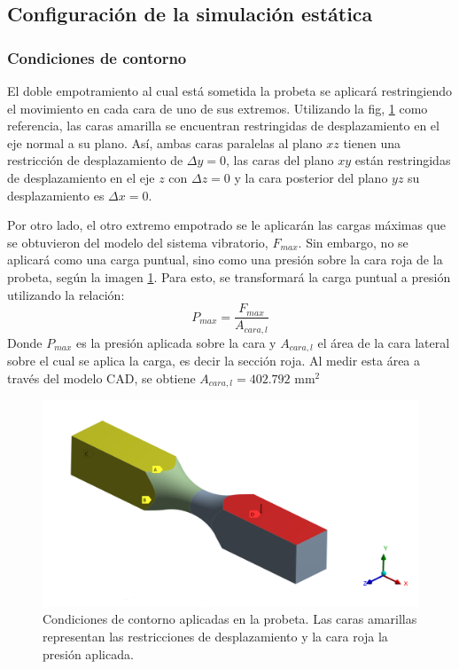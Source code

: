 \newpage

\subsection{Configuración de la simulación estática}
\subsubsection{Condiciones de contorno}
El doble empotramiento al cual está sometida la probeta se aplicará restringiendo el movimiento en cada cara de uno de sus extremos. Utilizando la fig, \ref{fig:cond_borde} como referencia, las caras amarilla se encuentran restringidas de desplazamiento en el eje normal a su plano. Así, ambas caras paralelas al plano $xz$ tienen una restricción de desplazamiento de $\Delta y = 0$, las caras del plano $xy$ están restringidas de desplazamiento en el eje $z$ con $\Delta z = 0$ y la cara posterior del plano $yz$ su desplazamiento es $\Delta x = 0$.

Por otro lado, el otro extremo empotrado se le aplicarán las cargas máximas que se obtuvieron del modelo del sistema vibratorio, $F_{max}$. Sin embargo, no se aplicará como una carga puntual, sino como una presión sobre la cara roja de la probeta, según la imagen \ref{fig:cond_borde}. Para esto, se transformará la carga puntual a presión utilizando la relación:
\begin{equation}\label{eq:p_max}
	P_{max} = \frac{F_{max}}{A_{cara,l}}
\end{equation}
Donde $P_{max}$ es la presión aplicada sobre la cara y $A_{cara,l}$ el área de la cara lateral sobre el cual se aplica la carga, es decir la sección roja. Al medir esta área a través del modelo CAD, se obtiene $A_{cara,l} = 402.792 \text{ mm}^2$

\begin{figure}[]
\centering
\includegraphics[width=0.7\linewidth]{Imagenes/cond_borde.png}
\caption{Condiciones de contorno aplicadas en la probeta. Las caras amarillas representan las restricciones de desplazamiento y la cara roja la presión aplicada.}
\label{fig:cond_borde}
\end{figure}

